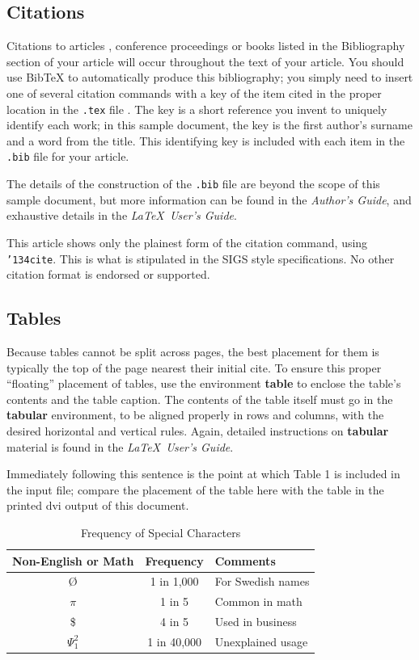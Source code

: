 \documentclass{sig-alternate-05-2015}
\begin{document}
\subsection{Citations}
Citations to articles \cite{bowman:reasoning,
clark:pct, braams:babel, herlihy:methodology},
conference proceedings \cite{clark:pct} or
books \cite{salas:calculus, Lamport:LaTeX} listed
in the Bibliography section of your
article will occur throughout the text of your article.
You should use BibTeX to automatically produce this bibliography;
you simply need to insert one of several citation commands with
a key of the item cited in the proper location in
the \texttt{.tex} file \cite{Lamport:LaTeX}.
The key is a short reference you invent to uniquely
identify each work; in this sample document, the key is
the first author's surname and a
word from the title.  This identifying key is included
with each item in the \texttt{.bib} file for your article.

The details of the construction of the \texttt{.bib} file
are beyond the scope of this sample document, but more
information can be found in the \textit{Author's Guide},
and exhaustive details in the \textit{\LaTeX\ User's
Guide}\cite{Lamport:LaTeX}.

This article shows only the plainest form
of the citation command, using \texttt{{\char'134}cite}.
This is what is stipulated in the SIGS style specifications.
No other citation format is endorsed or supported.

\subsection{Tables}
Because tables cannot be split across pages, the best
placement for them is typically the top of the page
nearest their initial cite.  To
ensure this proper ``floating'' placement of tables, use the
environment \textbf{table} to enclose the table's contents and
the table caption.  The contents of the table itself must go
in the \textbf{tabular} environment, to
be aligned properly in rows and columns, with the desired
horizontal and vertical rules.  Again, detailed instructions
on \textbf{tabular} material
is found in the \textit{\LaTeX\ User's Guide}.

Immediately following this sentence is the point at which
Table 1 is included in the input file; compare the
placement of the table here with the table in the printed
dvi output of this document.

\begin{table}
\centering
\caption{Frequency of Special Characters}
\begin{tabular}{|c|c|l|} \hline
Non-English or Math&Frequency&Comments\\ \hline
\O & 1 in 1,000& For Swedish names\\ \hline
$\pi$ & 1 in 5& Common in math\\ \hline
\$ & 4 in 5 & Used in business\\ \hline
$\Psi^2_1$ & 1 in 40,000& Unexplained usage\\
\hline\end{tabular}
\end{table}
\end{document}
